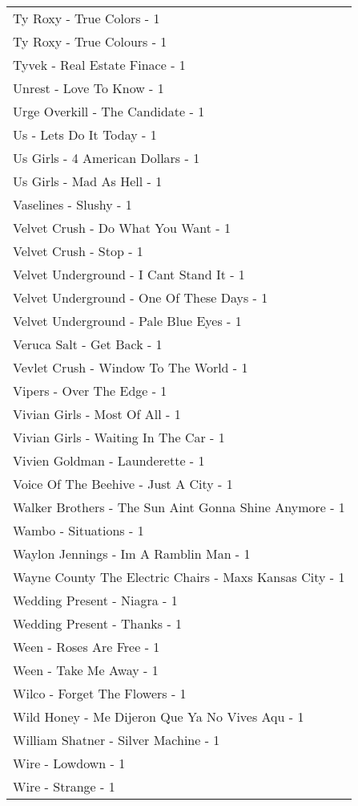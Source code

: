 \documentclass[
]{article}
\begin{document}
\begin{longtable}{l}
Ty Roxy - True Colors - 1 \\ 
Ty Roxy - True Colours - 1 \\ 
Tyvek - Real Estate Finace - 1 \\ 
Unrest - Love To Know - 1 \\ 
Urge Overkill - The Candidate - 1 \\ 
Us - Lets Do It Today - 1 \\ 
Us Girls - 4 American Dollars - 1 \\ 
Us Girls - Mad As Hell - 1 \\ 
Vaselines - Slushy - 1 \\ 
Velvet Crush - Do What You Want - 1 \\ 
Velvet Crush - Stop - 1 \\ 
Velvet Underground - I Cant Stand It - 1 \\ 
Velvet Underground - One Of These Days - 1 \\ 
Velvet Underground - Pale Blue Eyes - 1 \\ 
Veruca Salt - Get Back - 1 \\ 
Vevlet Crush - Window To The World - 1 \\ 
Vipers - Over The Edge - 1 \\ 
Vivian Girls - Most Of All - 1 \\ 
Vivian Girls - Waiting In The Car - 1 \\ 
Vivien Goldman - Launderette - 1 \\ 
Voice Of The Beehive - Just A City - 1 \\ 
Walker Brothers - The Sun Aint Gonna Shine Anymore - 1 \\ 
Wambo - Situations - 1 \\ 
Waylon Jennings - Im A Ramblin Man - 1 \\ 
Wayne County The Electric Chairs - Maxs Kansas City - 1 \\ 
Wedding Present - Niagra - 1 \\ 
Wedding Present - Thanks - 1 \\ 
Ween - Roses Are Free - 1 \\ 
Ween - Take Me Away - 1 \\ 
Wilco - Forget The Flowers - 1 \\ 
Wild Honey - Me Dijeron Que Ya No Vives Aqu - 1 \\ 
William Shatner - Silver Machine - 1 \\ 
Wire - Lowdown - 1 \\ 
Wire - Strange - 1 \\ 

\end{longtable}
\end{document}
